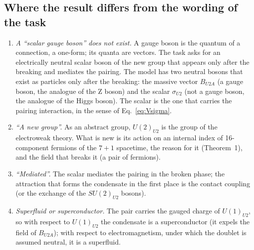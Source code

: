 \subsection{Where the result differs from the wording of the task}

\begin{enumerate}
\item \emph{A ``scalar gauge boson'' does not exist.} A gauge boson is the quantum of a connection, a
one-form; its quanta are vectors. The task asks for an electrically neutral scalar boson of the new
group that appears only after the breaking and mediates the pairing. The model has two neutral
bosons that exist as particles only after the breaking: the massive vector $B_{U2A}$ (a gauge boson,
the analogue of the Z boson) and the scalar $\sigma_{U2}$ (not a gauge boson, the analogue of the Higgs
boson). The scalar is the one that carries the pairing interaction, in the sense of
Eq.~\eqref{eq:Vsigma}.
\item \emph{``A new group''.} As an abstract group, $U(2)_{U2}$ is the group of the electroweak theory.
What is new is its action on an internal index of 16-component fermions of the $7+1$ spacetime, the
reason for it (Theorem~1), and the field that breaks it (a pair of fermions).
\item \emph{``Mediated''.} The scalar mediates the pairing in the broken phase; the attraction that
forms the condensate in the first place is the contact coupling (or the exchange of the
$SU(2)_{U2}$ bosons).
\item \emph{Superfluid or superconductor.} The pair carries the gauged charge of $U(1)_{U2}$, so with
respect to $U(1)_{U2}$ the condensate is a superconductor (it expels the field of $B_{U2A}$); with respect
to electromagnetism, under which the doublet is assumed neutral, it is a superfluid.
\end{enumerate}
